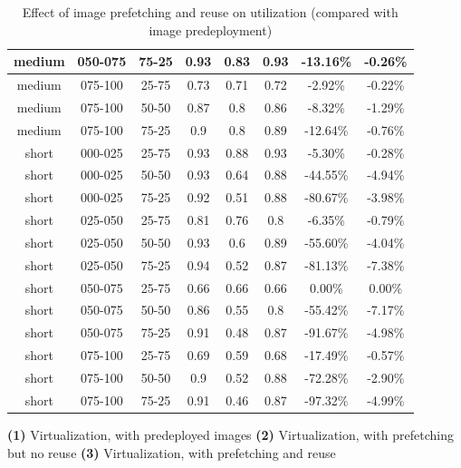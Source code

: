 \begin{table}
\begin{center}
\begin{tabular}{|c|c|c|c|c|c|c|c|}
\\\hline
medium & 050-075 & 75-25 & 0.93 & 0.83 & 0.93 & -13.16\% & -0.26\%
\\\hline
medium & 075-100 & 25-75 & 0.73 & 0.71 & 0.72 & -2.92\% & -0.22\%
\\\hline
medium & 075-100 & 50-50 & 0.87 & 0.8 & 0.86 & -8.32\% & -1.29\%
\\\hline
medium & 075-100 & 75-25 & 0.9 & 0.8 & 0.89 & -12.64\% & -0.76\%
\\\hline
short & 000-025 & 25-75 & 0.93 & 0.88 & 0.93 & -5.30\% & -0.28\%
\\\hline
short & 000-025 & 50-50 & 0.93 & 0.64 & 0.88 & -44.55\% & -4.94\%
\\\hline
short & 000-025 & 75-25 & 0.92 & 0.51 & 0.88 & -80.67\% & -3.98\%
\\\hline
short & 025-050 & 25-75 & 0.81 & 0.76 & 0.8 & -6.35\% & -0.79\%
\\\hline
short & 025-050 & 50-50 & 0.93 & 0.6 & 0.89 & -55.60\% & -4.04\%
\\\hline
short & 025-050 & 75-25 & 0.94 & 0.52 & 0.87 & -81.13\% & -7.38\%
\\\hline
short & 050-075 & 25-75 & 0.66 & 0.66 & 0.66 & 0.00\% & 0.00\%
\\\hline
short & 050-075 & 50-50 & 0.86 & 0.55 & 0.8 & -55.42\% & -7.17\%
\\\hline
short & 050-075 & 75-25 & 0.91 & 0.48 & 0.87 & -91.67\% & -4.98\%
\\\hline
short & 075-100 & 25-75 & 0.69 & 0.59 & 0.68 & -17.49\% & -0.57\%
\\\hline
short & 075-100 & 50-50 & 0.9 & 0.52 & 0.88 & -72.28\% & -2.90\%
\\\hline
short & 075-100 & 75-25 & 0.91 & 0.46 & 0.87 & -97.32\% & -4.99\%
\\\hline
\end{tabular}

\textbf{(1)} Virtualization, with predeployed images
\textbf{(2)} Virtualization, with prefetching but no reuse
\textbf{(3)} Virtualization, with prefetching and reuse
\caption{Effect of image prefetching and reuse on utilization (compared with image predeployment)}
\label{tab:predeployVSfetchUtil}
\end{center}
\end{table}



